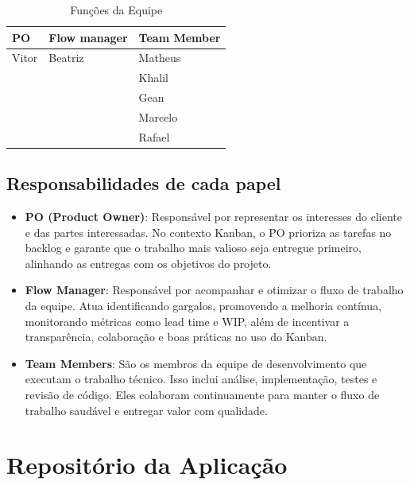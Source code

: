 \documentclass[
	12pt,				%
	openany,			%
	twoside,			%
	a4paper,			%
	english,			%
	brazil				%
	]{abntex2}
\begin{document}
\begin{table}[htbp]
\centering
\begin{tabular}{|l|l|l|}
\hline
\textbf{PO} & \textbf{Flow manager} & \textbf{Team Member} \\ \hline
Vitor        & Beatriz      & Matheus             \\ \hline
             &              & Khalil         \\ \hline
             &              & Gean                \\ \hline
             &              & Marcelo             \\ \hline
             &              & Rafael              \\ \hline
\end{tabular}
\caption{Funções da Equipe}
\end{table}

\FloatBarrier

\subsection{Responsabilidades de cada papel}

\begin{itemize}
    \item \textbf{PO (Product Owner)}: 
    Responsável por representar os interesses do cliente e das partes interessadas. No contexto Kanban, o PO prioriza as tarefas no backlog e garante que o trabalho mais valioso seja entregue primeiro, alinhando as entregas com os objetivos do projeto.
    
    \item \textbf{Flow Manager}: 
    Responsável por acompanhar e otimizar o fluxo de trabalho da equipe. Atua identificando gargalos, promovendo a melhoria contínua, monitorando métricas como lead time e WIP, além de incentivar a transparência, colaboração e boas práticas no uso do Kanban.
    
    \item \textbf{Team Members}: 
    São os membros da equipe de desenvolvimento que executam o trabalho técnico. Isso inclui análise, implementação, testes e revisão de código. Eles colaboram continuamente para manter o fluxo de trabalho saudável e entregar valor com qualidade.
\end{itemize}


\section{Repositório da Aplicação}
\end{document}

